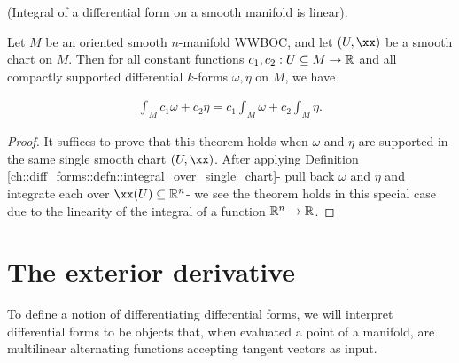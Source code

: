 \begin{theorem}
    (Integral of a differential form on a smooth manifold is linear).
    
    Let $M$ be an oriented smooth $n$-manifold WWBOC, and let $(U, \xx)$ be a smooth chart on $M$. Then for all constant functions $c_1, c_2:U \subseteq M \rightarrow \mathbb{R}$ and all compactly supported differential $k$-forms $\omega, \eta$ on $M$, we have
    
    \begin{align*}
        \int_M c_1 \omega + c_2 \eta = c_1 \int_M \omega + c_2 \int_M \eta.
    \end{align*}
\end{theorem}

\begin{proof}
    It suffices to prove that this theorem holds when $\omega$ and $\eta$ are supported in the same single smooth chart $(U, \xx)$. After applying Definition \ref{ch::diff_forms::defn::integral_over_single_chart}- pull back $\omega$ and $\eta$ and integrate each over $\xx(U) \subseteq \R^n$- we see the theorem holds in this special case due to the linearity of the integral of a function $\mathbb{R}^n \rightarrow \mathbb{R}$.
\end{proof}

\newpage

\section{The exterior derivative}

To define a notion of differentiating differential forms, we will interpret differential forms to be objects that, when evaluated a point of a manifold, are multilinear alternating functions accepting tangent vectors as input.

